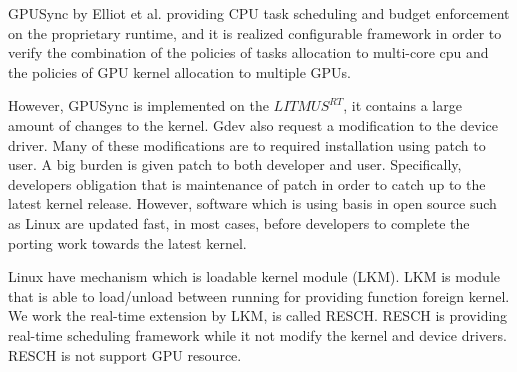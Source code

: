 GPUSync\cite{elliott:gpusync13,elliott:explor14} by Elliot et al. providing CPU task scheduling and budget enforcement on the proprietary runtime,
and it is realized configurable framework in order to verify the combination of the policies of tasks allocation to multi-core cpu and the policies of GPU kernel allocation to multiple GPUs.

However, GPUSync is implemented on the $LITMUS^{RT}$\cite{litmus}, it contains a large amount of changes to the kernel.
Gdev also request a modification to the device driver.
Many of these modifications are to required installation using patch to user.
A big burden is given patch to both developer and user.
Specifically, developers obligation that is maintenance of patch in order to catch up to the latest kernel release.
However, software which is using basis in open source such as Linux are updated fast,
in most cases, before developers to complete the porting work towards the latest kernel.

Linux have mechanism which is loadable kernel module (LKM).
LKM is module that is able to load/unload between running for providing function foreign kernel.
We work the real-time extension by LKM, is called RESCH.
RESCH is providing real-time scheduling framework while it not modify the kernel and device drivers.
RESCH is not support GPU resource.



